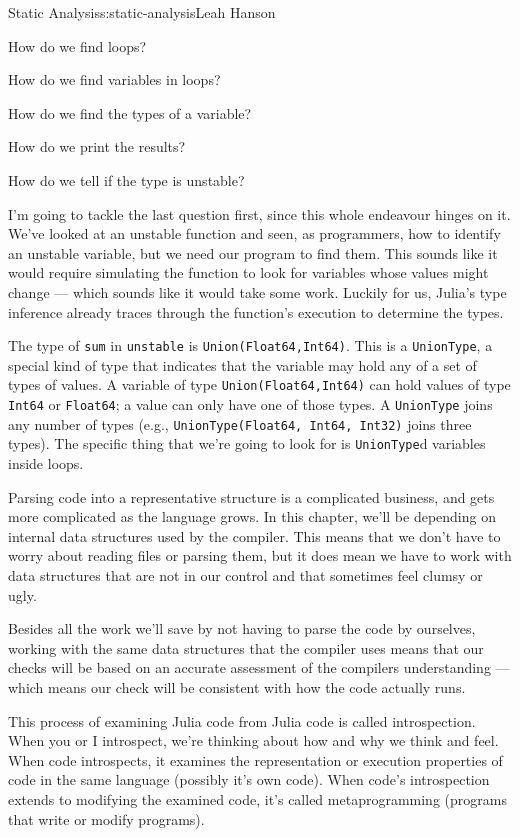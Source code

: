 \begin{aosachapter}{Static Analysis}{s:static-analysis}{Leah Hanson}
\begin{aosaitemize}

\item
  How do we find loops?
\item
  How do we find variables in loops?
\item
  How do we find the types of a variable?
\item
  How do we print the results?
\item
  How do we tell if the type is unstable?
\end{aosaitemize}

I'm going to tackle the last question first, since this whole endeavour
hinges on it. We've looked at an unstable function and seen, as
programmers, how to identify an unstable variable, but we need our
program to find them. This sounds like it would require simulating the
function to look for variables whose values might change --- which
sounds like it would take some work. Luckily for us, Julia's type
inference already traces through the function's execution to determine
the types.

The type of \texttt{sum} in \texttt{unstable} is
\texttt{Union(Float64,Int64)}. This is a \texttt{UnionType}, a special
kind of type that indicates that the variable may hold any of a set of
types of values. A variable of type \texttt{Union(Float64,Int64)} can
hold values of type \texttt{Int64} or \texttt{Float64}; a value can only
have one of those types. A \texttt{UnionType} joins any number of types
(e.g., \texttt{UnionType(Float64, Int64, Int32)} joins three types). The
specific thing that we're going to look for is \texttt{UnionType}d
variables inside loops.

Parsing code into a representative structure is a complicated business,
and gets more complicated as the language grows. In this chapter, we'll
be depending on internal data structures used by the compiler. This
means that we don't have to worry about reading files or parsing them,
but it does mean we have to work with data structures that are not in
our control and that sometimes feel clumsy or ugly.

Besides all the work we'll save by not having to parse the code by
ourselves, working with the same data structures that the compiler uses
means that our checks will be based on an accurate assessment of the
compilers understanding --- which means our check will be consistent
with how the code actually runs.

This process of examining Julia code from Julia code is called
introspection. When you or I introspect, we're thinking about how and
why we think and feel. When code introspects, it examines the
representation or execution properties of code in the same language
(possibly it's own code). When code's introspection extends to modifying
the examined code, it's called metaprogramming (programs that write or
modify programs).


\end{aosachapter}
